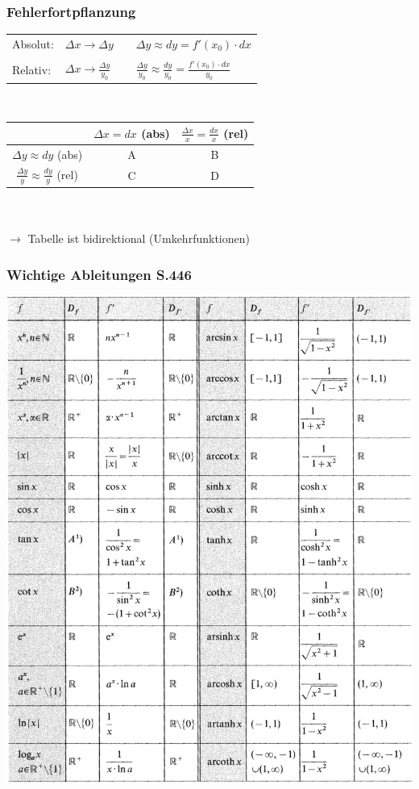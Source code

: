 			
			\subsubsection{Fehlerfortpflanzung} 
			\begin{tabular}{llll}
			Absolut: & $\Delta x \rightarrow \Delta y$ & &
			$\Delta y \approx dy = f'(x_0) \cdot dx$ \\
			\\
			Relativ: & $\Delta x \rightarrow \frac{\Delta y}  {y_0}$ & &  $\frac{\Delta y}  {y_0} \approx \frac{dy}{y_0} = \frac{f'(x_0) \cdot dx}{y_0} $ \\
			\end{tabular}
			 \\

			\begin{tabular}{| c | c | c |}
			\hline
			& $\Delta x = dx$ (abs) & $\frac{\Delta x}{x} = \frac{dx}{x}$ (rel)  \\
			\hline
			$\Delta y \approx dy$ (abs) & A & B \\
			\hline
			$\frac{\Delta y}{y} \approx \frac{dy}{y}$ (rel) & C & D \\
			\hline
			\end{tabular}					
			\\ \\
			$\rightarrow$ Tabelle ist bidirektional (Umkehrfunktionen)
			
			
			\subsubsection{Wichtige Ableitungen S.446}
			
			\includegraphics[width=\linewidth]{Bilder/ableitungen}

